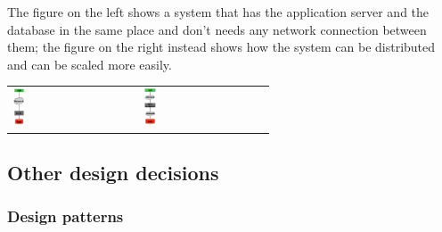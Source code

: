 	The figure on the left shows a system that has the application server and the database in the same place and don't needs any network connection between them; the figure on the right instead shows how the system can be distributed and can be scaled more easily.
	\begin{center}
		\begin{tabular}{>{\centering}m{5cm}|>{\centering}m{5cm}}
			\includegraphics[width=0.10\textwidth]{./images/architecture1.png} & 	
			\includegraphics[width=0.10\textwidth]{./images/architecture2.png}  \\ 
		\end{tabular} 
	\end{center}	  	
\subsection{Other design decisions}
	\subsubsection{Design patterns}